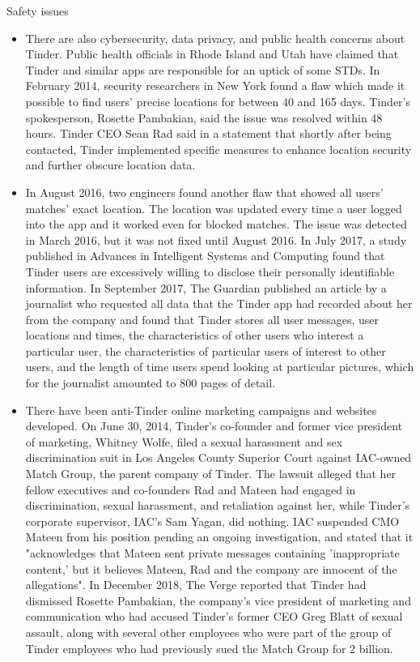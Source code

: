 \documentclass[UTF8]{ctexart}
\begin{document}
\begin{tcolorbox}[breakable]
    Safety issues
    \begin{itemize}
        \item There are also cybersecurity, data privacy, and public health concerns about Tinder. Public health officials in Rhode Island and Utah have claimed that Tinder and similar apps are responsible for an uptick of some STDs. In February 2014, security researchers in New York found a flaw which made it possible to find users' precise locations for between 40 and 165 days. Tinder's spokesperson, Rosette Pambakian, said the issue was resolved within 48 hours. Tinder CEO Sean Rad said in a statement that shortly after being contacted, Tinder implemented specific measures to enhance location security and further obscure location data.
        \item In August 2016, two engineers found another flaw that showed all users' matches' exact location. The location was updated every time a user logged into the app and it worked even for blocked matches. The issue was detected in March 2016, but it was not fixed until August 2016. In July 2017, a study published in Advances in Intelligent Systems and Computing found that Tinder users are excessively willing to disclose their personally identifiable information. In September 2017, The Guardian published an article by a journalist who requested all data that the Tinder app had recorded about her from the company and found that Tinder stores all user messages, user locations and times, the characteristics of other users who interest a particular user, the characteristics of particular users of interest to other users, and the length of time users spend looking at particular pictures, which for the journalist amounted to 800 pages of detail.
        \item There have been anti-Tinder online marketing campaigns and websites developed. On June 30, 2014, Tinder's co-founder and former vice president of marketing, Whitney Wolfe, filed a sexual harassment and sex discrimination suit in Los Angeles County Superior Court against IAC-owned Match Group, the parent company of Tinder. The lawsuit alleged that her fellow executives and co-founders Rad and Mateen had engaged in discrimination, sexual harassment, and retaliation against her, while Tinder's corporate supervisor, IAC's Sam Yagan, did nothing. IAC suspended CMO Mateen from his position pending an ongoing investigation, and stated that it "acknowledges that Mateen sent private messages containing 'inappropriate content,' but it believes Mateen, Rad and the company are innocent of the allegations". In December 2018, The Verge reported that Tinder had dismissed Rosette Pambakian, the company's vice president of marketing and communication who had accused Tinder's former CEO Greg Blatt of sexual assault, along with several other employees who were part of the group of Tinder employees who had previously sued the Match Group for 2 billion.\cite{WikiTinderFeatures}
    \end{itemize}
\end{tcolorbox}
\end{document}
